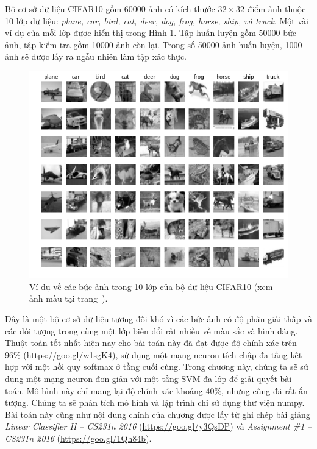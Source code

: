Bộ cơ sở dữ liệu CIFAR10 gồm 60000 ảnh có kích thước $32 \times 32$ điểm ảnh
thuộc 10 lớp dữ liệu: \textit{plane, car, bird, cat, deer, dog, frog, horse,
ship, và truck}. Một vài ví dụ của mỗi lớp được hiển thị trong Hình \ref{fig:22_2}.
Tập huấn luyện gồm 50000 bức ảnh, tập kiểm tra gồm 10000 ảnh còn lại.
Trong số 50000 ảnh huấn luyện, 1000 ảnh sẽ được lấy ra ngẫu nhiên làm tập xác
thực.
 \begin{figure}[t]
\centering
    \includegraphics[width = \textwidth]{Chapters/09_SupportVectorMachines/22_multiclasssvm/cifar_gray.png}
    \caption[]{Ví dụ về các bức ảnh trong 10 lớp của bộ dữ liệu CIFAR10 (xem ảnh màu tại trang~\pageref{fig:22_2_c}).}
    \label{fig:22_2}
\end{figure}
Đây là một bộ cơ sở dữ liệu tương đối khó vì các bức ảnh có độ phân giải thấp và
các đối tượng trong cùng một lớp biến đổi rất nhiều về màu sắc và hình dáng.
Thuật toán tốt nhất hiện nay cho bài toán này đã đạt được độ chính xác trên 96\%
(\url{https://goo.gl/w1sgK4}), sử dụng một mạng neuron tích chập đa tầng kết hợp
với một hồi quy softmax ở tầng cuối cùng. Trong chương này, chúng ta sẽ sử dụng
một mạng neuron đơn giản với một tầng SVM đa lớp để giải quyết bài toán. Mô hình
này chỉ mang lại độ chính xác khoảng 40\%, nhưng cũng đã rất ấn tượng. Chúng ta
sẽ phân tích mô hình và lập trình chỉ sử dụng thư viện numpy. Bài toán này cũng
như nội dung chính của chương được lấy từ ghi chép bài giảng \textit{Linear
Classifier II  --  CS231n 2016} (\url{https://goo.gl/y3QsDP}) và
\textit{Assignment \#1  --  CS231n 2016} (\url{https://goo.gl/1Qh84b}).
 

